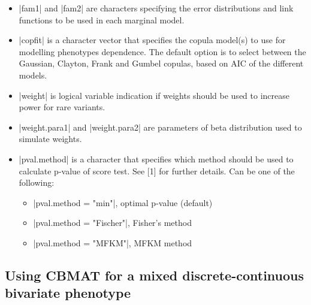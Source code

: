 \documentclass{article}\usepackage[]{graphicx}\usepackage[]{color}
\begin{document}
\begin{itemize}
\item |fam1| and |fam2| are characters specifying the error distributions and link functions to be used in each marginal model.

\item |copfit| is a character vector that specifies the copula model(s) to use for modelling phenotypes dependence. The default option is to select between the Gaussian, Clayton, Frank and Gumbel copulas, based on AIC of the different models.

\item |weight| is logical variable indication if weights should be used to increase power for rare variants.

\item |weight.para1| and |weight.para2| are parameters of beta distribution used to simulate weights.

\item |pval.method| is a character that specifies which method should be used to calculate p-value of score test. See [1] for further details. Can be one of the following:
\begin{itemize}
\item |pval.method = "min"|, optimal p-value (default)
\item |pval.method = "Fischer"|, Fisher's method
\item |pval.method = "MFKM"|, MFKM method
\end{itemize}

\end{itemize}

\subsection{Using CBMAT for a mixed discrete-continuous bivariate phenotype}
\label{sec:mixed}
\end{document}
